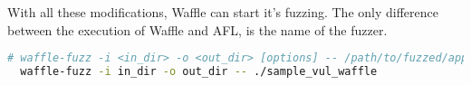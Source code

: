 

With all these modifications, Waffle can start it's fuzzing. The only difference between the execution of Waffle and AFL, is the name of the fuzzer.

\begin{lstlisting}[language=bash,style=CommandStyle,caption=Execute AFL]
  # waffle-fuzz -i <in_dir> -o <out_dir> [options] -- /path/to/fuzzed/app [params]
  waffle-fuzz -i in_dir -o out_dir -- ./sample_vul_waffle
\end{lstlisting}
